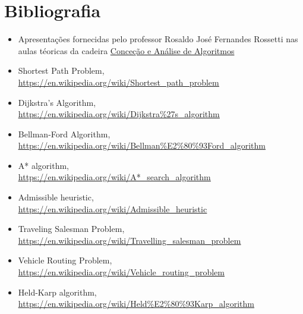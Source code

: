 \documentclass[article, a4paper, 12pt, oneside]{memoir}
\begin{document}
\chapter{Bibliografia}
\begin{itemize}
	\item Apresentações fornecidas pelo professor Rosaldo José Fernandes Rossetti nas aulas téoricas da cadeira \href{https://sigarra.up.pt/feup/pt/ucurr_geral.ficha_uc_view?pv_ocorrencia_id=436441}{Conceção e Análise de Algoritmos}
	\item Shortest Path Problem,\\
	\color{blue} \underline{\href{https://en.wikipedia.org/wiki/Shortest_path_problem}{https://en.wikipedia.org/wiki/Shortest\_path\_problem}} \color{black}
	\item Dijkstra's Algorithm,\\
	\color{blue} \underline{\href{https://en.wikipedia.org/wiki/Dijkstra\%27s_algorithm}{https://en.wikipedia.org/wiki/Dijkstra\%27s\_algorithm}} \color{black}
	\item Bellman-Ford Algorithm,\\
	\color{blue} \underline{\href{https://en.wikipedia.org/wiki/Bellman\%E2\%80\%93Ford_algorithm}{https://en.wikipedia.org/wiki/Bellman\%E2\%80\%93Ford\_algorithm}} \color{black}
	\item A* algorithm,\\
	\color{blue} \underline{\href{https://en.wikipedia.org/wiki/A*_search_algorithm}{https://en.wikipedia.org/wiki/A*\_search\_algorithm}} \color{black}
	\item Admissible heuristic,\\
	\color{blue} \underline{\href{https://en.wikipedia.org/wiki/Admissible_heuristic}{https://en.wikipedia.org/wiki/Admissible\_heuristic}} \color{black}
	\item Traveling Salesman Problem,\\
	\color{blue} \underline{\href{https://en.wikipedia.org/wiki/Travelling_salesman_problem}{https://en.wikipedia.org/wiki/Travelling\_salesman\_problem}} \color{black}
	\item Vehicle Routing Problem,\\
	\color{blue} \underline{\href{https://en.wikipedia.org/wiki/Vehicle_routing_problem}{https://en.wikipedia.org/wiki/Vehicle\_routing\_problem}} \color{black}
	\item Held-Karp algorithm,\\
	\color{blue} \underline{\href{https://en.wikipedia.org/wiki/Held\%E2\%80\%93Karp_algorithm}{https://en.wikipedia.org/wiki/Held\%E2\%80\%93Karp\_algorithm}} \color{black}

\end{itemize}
\end{document}
